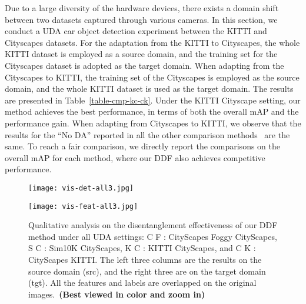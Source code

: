 \documentclass[journal]{IEEEtran}
\begin{document}
Due to a large diversity of the hardware devices, there exists a domain shift between two datasets captured through various cameras. In this section, we conduct a UDA car object detection experiment between the KITTI and Cityscapes datasets. For the adaptation from the KITTI to Cityscapes, the whole KITTI dataset is employed as a source domain, and the training set for the Cityscapes dataset is adopted as the target domain. When adapting from the Cityscapes to KITTI, the training set of the Cityscapes is employed as the source domain, and the whole KITTI dataset is used as the target domain. The results are presented in Table~\ref{table-cmp-kc-ck}. Under the KITTI  Cityscape setting, our method achieves the best performance, in terms of both the overall mAP and the performance gain. When adapting from Cityscapes to KITTI, we observe that the results for the ``No DA'' reported in all the other comparison methods~\cite{chen2018domain,he2019multi,he2020domain,vs2021mega} are the same. To reach a fair comparison, we directly report the comparisons on the overall mAP for each method, where our DDF also achieves competitive performance. 

{}


\begin{figure*}[htbp]
\centering
\texttt{[image: vis-det-all3.jpg]}

\caption{{} }
\label{fig-vis-det-all}
\end{figure*}

\begin{figure*}[htbp]
\centering
\texttt{[image: vis-feat-all3.jpg]}

\caption{Qualitative analysis on the disentanglement effectiveness of our DDF method under all UDA settings: C  F : CityScapes  Foggy CityScapes, S  C : Sim10K  CityScapes, K  C : KITTI  CityScapes, and C  K : CityScapes  KITTI. The left three columns are the results on the source domain (src), and the right three are on the target domain (tgt). All the features and labels are overlapped on the original images.~\textbf{(Best viewed in color and zoom in)} }
\label{fig-vis-feat}
\end{figure*}
\end{document}
